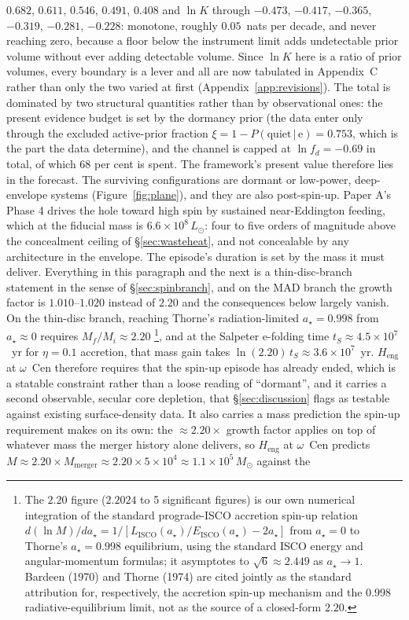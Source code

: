 \documentclass[11pt]{article}
\newcommand{\msun}{\ensuremath{M_\odot}}
\newcommand{\astar}{\ensuremath{a_\star}}
\newcommand{\ocen}{\ensuremath{\omega}~Cen}
\newcommand{\lnK}{\ensuremath{\ln K}}
\newcommand{\Heng}{\ensuremath{H_{\mathrm{eng}}}}
\begin{document}
\begin{itemize}
$0.682$, $0.611$, $0.546$, $0.491$, $0.408$ and \lnK{} through $-0.473$, $-0.417$, $-0.365$, $-0.319$, $-0.281$, $-0.228$: monotone, roughly $0.05$~nats per decade, and never reaching zero, because a floor below the instrument limit adds undetectable prior volume without ever adding detectable volume. Since \lnK{} here is a ratio of prior volumes, every boundary is a lever and all are now tabulated in Appendix~C rather than only the two varied at first (Appendix~\ref{app:revisions}). The total is dominated by two structural quantities rather than by observational ones: the present evidence budget is set by the dormancy prior (the data enter only through the excluded active-prior fraction $\xi = 1 - P(\mathrm{quiet}\,|\,\mathrm{e}) = 0.753$, which is the part the data determine), and the channel is capped at $\ln f_{d} = -0.69$ in total, of which $68$ per cent is spent. The framework's present value therefore lies in the forecast. The surviving configurations are dormant or low-power, deep-envelope systems (Figure~\ref{fig:plane}), and they are also post-spin-up. Paper A's Phase 4 drives the hole toward high spin by sustained near-Eddington feeding, which at the fiducial mass is $6.6\times10^{8}\,L_{\odot}$: four to five orders of magnitude above the concealment ceiling of \S\ref{sec:wasteheat}, and not concealable by any architecture in the envelope. The episode's duration is set by the mass it must deliver. Everything in this paragraph and the next is a thin-disc-branch statement in the sense of \S\ref{sec:spinbranch}, and on the MAD branch the growth factor is $1.010$--$1.020$ instead of $2.20$ and the consequences below largely vanish. On the thin-disc branch, reaching Thorne's radiation-limited $\astar = 0.998$ from $\astar \approx 0$ requires $M_{f}/M_{i} \approx 2.20$ \citep{Bardeen1970,Thorne1974}\footnote{The $2.20$ figure ($2.2024$ to 5 significant figures) is our own numerical integration of the standard prograde-ISCO accretion spin-up relation $d(\ln M)/d\astar = 1/[L_{\mathrm{ISCO}}(\astar)/E_{\mathrm{ISCO}}(\astar) - 2\astar]$ from $\astar = 0$ to Thorne's $\astar = 0.998$ equilibrium, using the standard \citet{BardeenPressTeukolsky1972} ISCO energy and angular-momentum formulas; it asymptotes to $\sqrt{6} \approx 2.449$ as $\astar \to 1$. Bardeen (1970) and Thorne (1974) are cited jointly as the standard attribution for, respectively, the accretion spin-up mechanism and the $0.998$ radiative-equilibrium limit, not as the source of a closed-form $2.20$.}, and at the Salpeter e-folding time $t_{S} \approx 4.5\times10^{7}$~yr for $\eta = 0.1$ accretion, that mass gain takes $\ln(2.20)\,t_{S} \approx 3.6\times10^{7}$~yr. \Heng{} at \ocen{} therefore requires that the spin-up episode has already ended, which is a statable constraint rather than a loose reading of ``dormant'', and it carries a second observable, secular core depletion, that \S\ref{sec:discussion} flags as testable against existing surface-density data. It also carries a mass prediction the spin-up requirement makes on its own: the $\approx 2.20\times$ growth factor applies on top of whatever mass the merger history alone delivers, so \Heng{} at \ocen{} predicts $M \approx 2.20 \times M_{\mathrm{merger}} \approx 2.20 \times 5\times10^{4} \approx 1.1\times10^{5}\,\msun$ against the 
\end{itemize}
\end{document}
